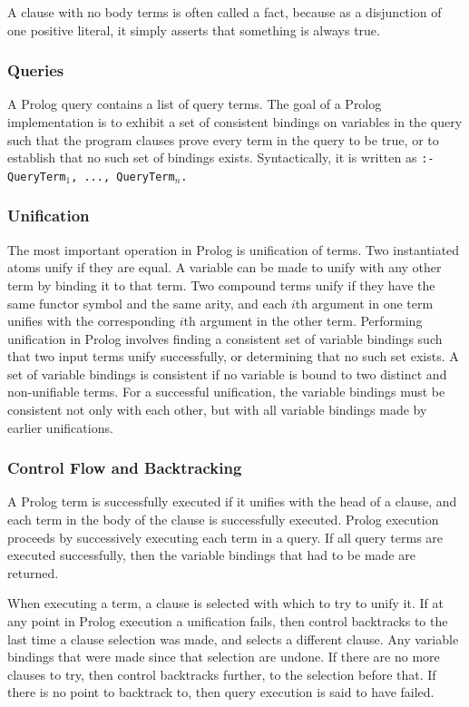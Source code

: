 \documentclass[12pt]{article}
\begin{document}
A clause with no body terms is often called a fact, because as a disjunction of one positive literal, it simply asserts that something is always true.

\subsubsection{Queries}

A Prolog query contains a list of query terms. 
The goal of a Prolog implementation is to exhibit a set of consistent bindings on variables in the query such that the program clauses prove every term in the query to be true, or to establish that no such set of bindings exists. 
Syntactically, it is written as \verb|:- QueryTerm|$_1$\verb|, ..., QueryTerm|$_n$\verb|.|

\subsubsection{Unification}

The most important operation in Prolog is unification of terms. 
Two instantiated atoms unify if they are equal. 
A variable can be made to unify with any other term by binding it to that term. 
Two compound terms unify if they have the same functor symbol and the same arity, and each $i$th argument in one term unifies with the corresponding $i$th argument in the other term. 
Performing unification in Prolog involves finding a consistent set of variable bindings such that two input terms unify successfully, or determining that no such set exists. 
A set of variable bindings is consistent if no variable is bound to two distinct and non-unifiable terms. 
For a successful unification, the variable bindings must be consistent not only with each other, but with all variable bindings made by earlier unifications.

\subsubsection{Control Flow and Backtracking}

A Prolog term is successfully executed if it unifies with the head of a clause, and each term in the body of the clause is successfully executed.
Prolog execution proceeds by successively executing each term in a query. 
If all query terms are executed successfully, then the variable bindings that had to be made are returned.

When executing a term, a clause is selected with which to try to unify it.
If at any point in Prolog execution a unification fails, then control backtracks to the last time a clause selection was made, and selects a different clause.
Any variable bindings that were made since that selection are undone.
If there are no more clauses to try, then control backtracks further, to the selection before that.
If there is no point to backtrack to, then query execution is said to have failed.
\end{document}
